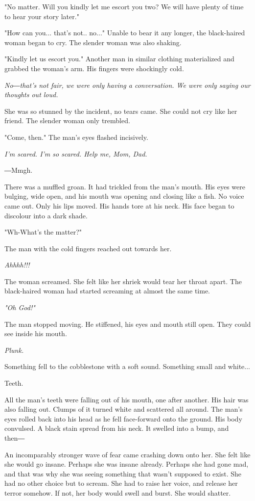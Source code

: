 "No matter. Will you kindly let me escort you two? We will have plenty
of time to hear your story later."

"How can you... that's not.. no..." Unable to bear it any longer, the
black-haired woman began to cry. The slender woman was also shaking.

"Kindly let us escort you." Another man in similar clothing materialized
and grabbed the woman's arm. His fingers were shockingly cold.

\emph{No―that's not fair, we were only having a conversation. We were only
	saying our thoughts out loud.}

She was so stunned by the incident, no tears came. She could not cry
like her friend. The slender woman only trembled.

"Come, then." The man's eyes flashed incisively.

\emph{I'm scared. I'm so scared. Help me, Mom, Dad.}

―Mmgh.

There was a muffled groan. It had trickled from the man's mouth. His
eyes were bulging, wide open, and his mouth was opening and closing like
a fish. No voice came out. Only his lips moved. His hands tore at his
neck. His face began to discolour into a dark shade.

"Wh-What's the matter?"

The man with the cold fingers reached out towards her.

\emph{Ahhhh!!!}

The woman screamed. She felt like her shriek would tear her throat
apart. The black-haired woman had started screaming at almost the same
time.

\emph{"Oh God!"}

The man stopped moving. He stiffened, his eyes and mouth still open.
They could see inside his mouth.

\emph{Plunk.}

Something fell to the cobblestone with a soft sound. Something small and
white...

Teeth.

All the man's teeth were falling out of his mouth, one after another.
His hair was also falling out. Clumps of it turned white and scattered
all around. The man's eyes rolled back into his head as he fell
face-forward onto the ground. His body convulsed. A black stain spread
from his neck. It swelled into a bump, and then―

An incomparably stronger wave of fear came crashing down onto her. She
felt like she would go insane. Perhaps she was insane already. Perhaps
she had gone mad, and that was why she was seeing something that wasn't
supposed to exist. She had no other choice but to scream. She had to
raise her voice, and release her terror somehow. If not, her body would
swell and burst. She would shatter.

